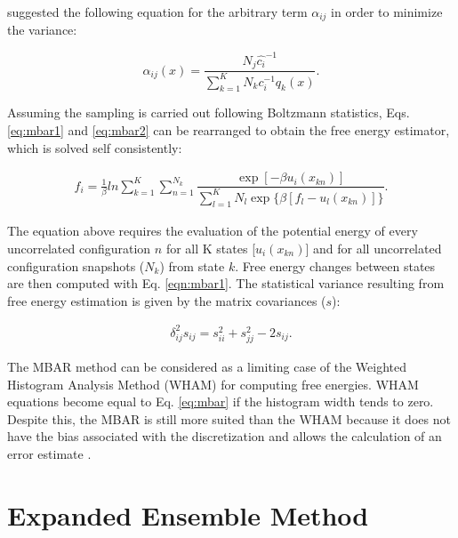 	 suggested the following equation for the arbitrary term $\alpha _{ij}$ in order to minimize the variance:
	
	\begin{equation}
	\label{eq:mbar2}
	\alpha _{ij} (x) = \frac{N_{j} \hat{c_{i}} ^{-1}}{\sum_{k=1}^{K} N_{k} c_{i} ^{-1} q_{k}(x)} .
	\end{equation}
	
	Assuming the sampling is carried out following Boltzmann statistics, Eqs. \eqref{eq:mbar1} and \eqref{eq:mbar2} can be rearranged to obtain the free energy estimator, which is solved self consistently:  
	
	\begin{equation}
	\label{eq:mbar}
	\begin{aligned}
	f_{i} = \frac{1}{\beta}ln \sum_{k=1}^{K} \sum_{n=1}^{N_{k}}
	\dfrac{\exp[-\beta u_{i}(x_{kn})]}{\sum_{l=1}^{K} N_{l} \exp \lbrace \beta [f_{l} - u_{l}(x_{kn})] \rbrace} .
	\end{aligned}
	\end{equation}
	
	The equation above requires the evaluation of the potential energy  of every  uncorrelated configuration $n$ for all K states [$u_{i}(x_{kn})$] and for all uncorrelated configuration snapshots ($N_{k}$) from state $k$. Free energy changes between states are then computed with Eq. \ref{eqn:mbar1}. The statistical variance resulting from free energy estimation is given by the matrix covariances ($s$):
	
	\begin{equation}
	\begin{aligned}
	\delta _{ij}^{2} s_{ij} = s_{ii}^{2} + s_{jj}^{2} - 2 s_{ij}.
	\end{aligned}
	\end{equation}
	
    The MBAR method can be considered as a limiting case of the 
	Weighted Histogram Analysis Method (WHAM) \cite{wham} for computing free energies. WHAM equations become equal to Eq. \eqref{eq:mbar} if the histogram width tends to zero. Despite this, the MBAR is still more suited than the WHAM because it does not have the bias associated with the discretization and allows the calculation of an error estimate \cite{mbar}.
	
\section{Expanded Ensemble Method}\label{ee}
	
